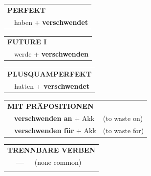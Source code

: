 \documentclass[10pt,a4paper]{revtex4-2}
\begin{document}
\begin{verbbox}
    \vspace{10pt}

 \begin{tabular}{rl}
     \multicolumn{2}{l}{\textbf{PERFEKT}}\\
   & haben + \textbf{verschwendet}\\
  \end{tabular}
\hfill
   \begin{tabular}{rl}
    \multicolumn{2}{l}{\textbf{FUTURE I} }\\
   & werde + \textbf{verschwenden}\\
  \end{tabular}
\hfill
   \begin{tabular}{rl}
      \multicolumn{2}{l}{\textbf{PLUSQUAMPERFEKT}}\\
   & hatten + \textbf{verschwendet}\\
  \end{tabular}

   \vspace{10pt}

   \begin{tabular}{lll}
      \multicolumn{3}{l}{\textbf{MIT PRÄPOSITIONEN}}\\
& \textbf{verschwenden an} + Akk & (to waste on)\\
& \textbf{verschwenden für} + Akk & (to waste for)\\
\end{tabular}
  \hfill
   \begin{tabular}{lll}
      \multicolumn{3}{l}{\textbf{TRENNBARE VERBEN}}\\
 & \textbf{---} & (none common)\\
\vspace{10pt}
  \end{tabular}

  \vspace{-5pt}

\end{verbbox}
\end{document}
